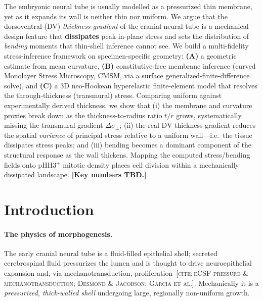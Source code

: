 \documentclass[11pt]{article}
\newcommand{\dsig}{\Delta\sigma_{\perp}}      %
\newcommand{\tor}{t/r}                          %
\newcommand{\citeneed}[1]{{\small\color{blue!55!black}\textsc{[cite:\,#1]}}}
\begin{document}
The embryonic neural tube is usually modelled as a pressurized thin membrane, yet as it
expands its wall is neither thin nor uniform. We argue that the dorsoventral (DV)
\emph{thickness gradient} of the cranial neural tube is a mechanical design feature that
\textbf{dissipates} peak in-plane stress and sets the distribution of \emph{bending} moments
that thin-shell inference cannot see. We build a multi-fidelity stress-inference framework on
specimen-specific geometry: \textbf{(A)} a geometric estimate from mean curvature, \textbf{(B)}
constitutive-free membrane inference (curved Monolayer Stress Microscopy, CMSM, via a surface
generalized-finite-difference solve), and \textbf{(C)} a 3D neo-Hookean hyperelastic
finite-element model that resolves the through-thickness (transmural) stress. Comparing uniform
against experimentally derived thickness, we show that (i) the membrane and curvature proxies
break down as the thickness-to-radius ratio $\tor$ grows, systematically missing the transmural
gradient $\dsig$; (ii) the real DV thickness gradient reduces the spatial \emph{variance} of
principal stress relative to a uniform wall---i.e.\ the tissue dissipates stress peaks; and
(iii) bending becomes a dominant component of the structural response as the wall thickens.
Mapping the computed stress/bending fields onto pHH3$^+$ mitotic density places cell division
within a mechanically dissipated landscape. \textbf{[Key numbers TBD.]}

\section{Introduction}

\paragraph{The physics of morphogenesis.} The early cranial neural tube is a fluid-filled
epithelial shell; secreted cerebrospinal fluid pressurizes the lumen and is thought to drive
neuroepithelial expansion and, via mechanotransduction,
proliferation~\citeneed{eCSF pressure \& mechanotransduction; Desmond \& Jacobson; Garcia et al.}.
Mechanically it is a \emph{pressurized, thick-walled shell} undergoing large, regionally
non-uniform growth.
\end{document}
